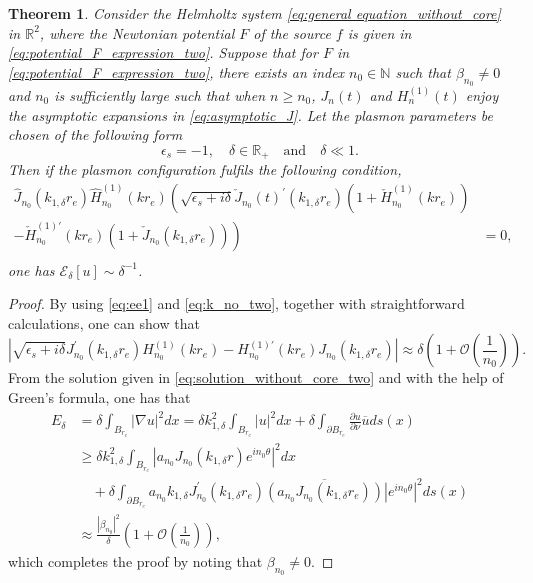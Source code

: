 \documentclass[11pt,reqno,twoside]{amsart}
\newtheorem{thm}{Theorem}[section]
\theoremstyle{definition}
\theoremstyle{remark}
\numberwithin{equation}{section}
\begin{document}
\begin{thm}\label{thm:main2d1}
Consider the Helmholtz system \eqref{eq:general equation_without_core} in $\mathbb{R}^2$, where the Newtonian potential $F$ of the source $f$ is given in \eqref{eq:potential_F_expression_two}. Suppose that for $F$ in \eqref{eq:potential_F_expression_two}, there exists an index $n_0\in\mathbb{N}$ such that $\beta_{n_0}\neq 0$ and $n_0$ is sufficiently large such that when $n\geq n_0$, $J_n(t)$ and $H_n^{(1)}(t)$ enjoy the asymptotic expansions in \eqref{eq:asymptotic_J}. Let the plasmon parameters be chosen of the following form
\begin{equation}\label{eq:ee1}
\epsilon_s=-1, \quad \delta\in\mathbb{R}_+\quad\mbox{and}\quad \delta\ll 1. 
\end{equation}
Then if the plasmon configuration fulfils the following condition, 
\begin{equation}\label{eq:k_no_two}
\begin{split}
 \hat{J}_{n_0}(k_{1,\delta} r_e) \hat{H}_{n_0}^{(1)}(kr_e)  \left(  \sqrt{\epsilon_s+i\delta}  \check{J}_{n_0}(t)^{\prime}(k_{1,\delta} r_e)\left(1+\check{H}_{n_0}^{(1)}(kr_e)\right)  \right.& \\
               \left. -\check{H}_{n_0}^{(1)\prime}(kr_e)\left(1+\check{J}_{n_0}(k_{1,\delta} r_e)\right)   \right)&=0,   \\
\end{split}	
\end{equation}
one has $\mathscr{E}_\delta[u]\sim\delta^{-1}$. 
\end{thm}
\begin{proof}
By using \eqref{eq:ee1} and \eqref{eq:k_no_two}, together with straightforward calculations, one can show that 
\begin{equation}
  \left|\sqrt{\epsilon_s+i\delta} J_{n_0}^{\prime}(k_{1,\delta}r_e)H_{n_0}^{(1)}(kr_e) - H_{n_0}^{(1)\prime}(kr_e)J_{n_0}(k_{1,\delta}r_e) \right|\approx \delta \left(1+\mathcal{O}\left(\frac{1}{n_0}\right) \right).
\end{equation}
From the solution given in \eqref{eq:solution_without_core_two} and with the help of Green's formula, one has that
\begin{equation}
 \begin{split}
   E_{\delta} & =\delta\int_{B_{r_e}}|\nabla u|^2dx = \delta k_{1,\delta}^2\int_{B_{r_e}}|u|^2dx + \delta\int_{\partial B_{r_e}} \frac{\partial u}{\partial \nu} \overline{u}ds(x)\\
     & \geq \delta k_{1,\delta}^2\int_{B_{r_e}}|a_{n_0} J_{n_0}(k_{1,\delta}r) e^{in_0\theta}|^2dx \\
     & \quad +\delta\int_{\partial B_{r_e}} a_{n_0} k_{1,\delta} J_{n_0}^{\prime}(k_{1,\delta}r_e)  \overline{ \left(a_{n_0}   J_{n_0}(k_{1,\delta}r_e) \right)} |e^{in_0\theta}|^2 ds(x) \\
     & \approx \frac{|\beta_{n_0}|^2}{\delta}\left(1+\mathcal{O}\left(\frac{1}{n_0}\right) \right),
 \end{split}
\end{equation}
which completes the proof by noting that $\beta_{n_0}\neq 0$. 
\end{proof}
\end{document}
